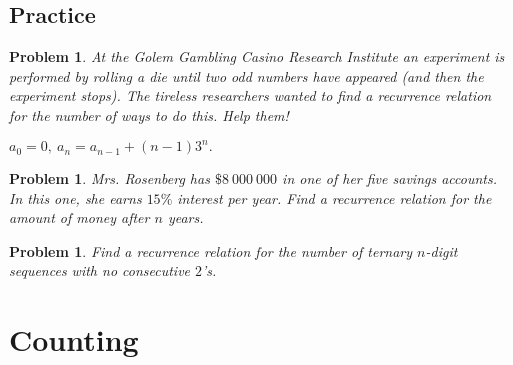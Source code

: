 \documentclass[11pt, openany]{book}
\theoremstyle{change} \theoremheaderfont{\blue\sffamily\bfseries}
\newtheorem{pro}[thm]{Problem}
\theoremstyle{nonumberplain} \theoremheaderfont{\sffamily\bfseries}
\newcommand{\í}{\'{\i}}
\begin{document}
\section*{Practice}\begin{multicols}{2}\columnseprule 1pt \columnsep 25pt

\begin{pro} At the {\em Golem Gambling Casino Research Institute} an
experiment is performed by rolling a die until two odd numbers
have appeared (and then the experiment stops). The tireless
researchers wanted to find a recurrence relation for the number of
ways to do this. Help them!
\begin{answer}
$a_0 = 0, \ a_n = a_{n - 1} + (n - 1)3^n .$
\end{answer}

\end{pro}
\begin{pro} Mrs. Rosenberg has $\$ 8 \ 000 \ 000$ in one of her five savings
accounts. In this one, she earns $15 \%$ interest per year. Find a
recurrence relation for the amount of money after $n$ years.
\end{pro}
\begin{pro} Find a recurrence relation for the number of ternary $n$-digit
sequences with no consecutive $2$'s. \end{pro}
\end{multicols}
\chapter{Counting}
\end{document}

